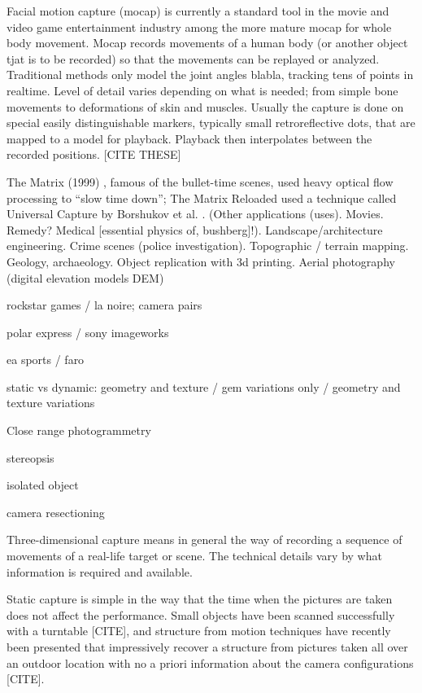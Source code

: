 Facial motion capture (mocap) is currently a standard tool in the movie and video game entertainment industry among the more mature mocap for whole body movement.
Mocap records movements of a human body (or another object tjat is to be recorded) so that the movements can be replayed or analyzed. Traditional methods only model the joint angles blabla, tracking tens of points in realtime.
Level of detail varies depending on what is needed; from simple bone movements to deformations of skin and muscles.
Usually the capture is done on special easily distinguishable markers, typically small retroreflective dots, that are mapped to a model for playback. Playback then interpolates between the recorded positions. [CITE THESE]

The Matrix (1999) \cite{wachowski99matrix}, famous of the bullet-time scenes, used heavy optical flow processing to ``slow time down''; The Matrix Reloaded \cite{wachowski03reloaded} used a technique called Universal Capture by Borshukov et al. \cite{borshukov05universal}.
(Other applications (uses). Movies. Remedy? Medical [essential physics of, bushberg]!). Landscape/architecture engineering. Crime scenes (police investigation). Topographic / terrain mapping. Geology, archaeology. Object replication with 3d printing. Aerial photography (digital elevation models DEM)

rockstar games / la noire; camera pairs

polar express / sony imageworks

ea sports / faro


static vs dynamic: geometry and texture / gem variations only / geometry and texture variations

Close range photogrammetry

stereopsis

isolated object

camera resectioning

Three-dimensional capture means in general the way of recording a sequence of movements of a real-life target or scene.
The technical details vary by what information is required and available.

Static capture is simple in the way that the time when the pictures are taken does not affect the performance.
Small objects have been scanned successfully with a turntable [CITE], and structure from motion techniques have recently been presented that impressively recover a structure from pictures taken all over an outdoor location with no a priori information about the camera configurations [CITE].

